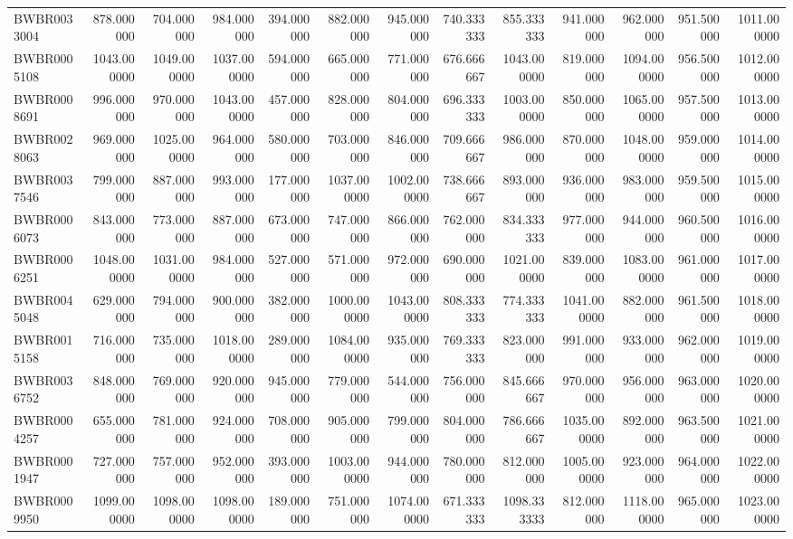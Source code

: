 \begin{longtable}{lrrrrrrrrrrrr}
BWBR0033004 & 878.000000 & 704.000000 & 984.000000 & 394.000000 & 882.000000 & 945.000000 & 740.333333 & 855.333333 & 941.000000 & 962.000000 & 951.500000 & 1011.000000 \\
BWBR0005108 & 1043.000000 & 1049.000000 & 1037.000000 & 594.000000 & 665.000000 & 771.000000 & 676.666667 & 1043.000000 & 819.000000 & 1094.000000 & 956.500000 & 1012.000000 \\
BWBR0008691 & 996.000000 & 970.000000 & 1043.000000 & 457.000000 & 828.000000 & 804.000000 & 696.333333 & 1003.000000 & 850.000000 & 1065.000000 & 957.500000 & 1013.000000 \\
BWBR0028063 & 969.000000 & 1025.000000 & 964.000000 & 580.000000 & 703.000000 & 846.000000 & 709.666667 & 986.000000 & 870.000000 & 1048.000000 & 959.000000 & 1014.000000 \\
BWBR0037546 & 799.000000 & 887.000000 & 993.000000 & 177.000000 & 1037.000000 & 1002.000000 & 738.666667 & 893.000000 & 936.000000 & 983.000000 & 959.500000 & 1015.000000 \\
BWBR0006073 & 843.000000 & 773.000000 & 887.000000 & 673.000000 & 747.000000 & 866.000000 & 762.000000 & 834.333333 & 977.000000 & 944.000000 & 960.500000 & 1016.000000 \\
BWBR0006251 & 1048.000000 & 1031.000000 & 984.000000 & 527.000000 & 571.000000 & 972.000000 & 690.000000 & 1021.000000 & 839.000000 & 1083.000000 & 961.000000 & 1017.000000 \\
BWBR0045048 & 629.000000 & 794.000000 & 900.000000 & 382.000000 & 1000.000000 & 1043.000000 & 808.333333 & 774.333333 & 1041.000000 & 882.000000 & 961.500000 & 1018.000000 \\
BWBR0015158 & 716.000000 & 735.000000 & 1018.000000 & 289.000000 & 1084.000000 & 935.000000 & 769.333333 & 823.000000 & 991.000000 & 933.000000 & 962.000000 & 1019.000000 \\
BWBR0036752 & 848.000000 & 769.000000 & 920.000000 & 945.000000 & 779.000000 & 544.000000 & 756.000000 & 845.666667 & 970.000000 & 956.000000 & 963.000000 & 1020.000000 \\
BWBR0004257 & 655.000000 & 781.000000 & 924.000000 & 708.000000 & 905.000000 & 799.000000 & 804.000000 & 786.666667 & 1035.000000 & 892.000000 & 963.500000 & 1021.000000 \\
BWBR0001947 & 727.000000 & 757.000000 & 952.000000 & 393.000000 & 1003.000000 & 944.000000 & 780.000000 & 812.000000 & 1005.000000 & 923.000000 & 964.000000 & 1022.000000 \\
BWBR0009950 & 1099.000000 & 1098.000000 & 1098.000000 & 189.000000 & 751.000000 & 1074.000000 & 671.333333 & 1098.333333 & 812.000000 & 1118.000000 & 965.000000 & 1023.000000 \\

\end{longtable}
